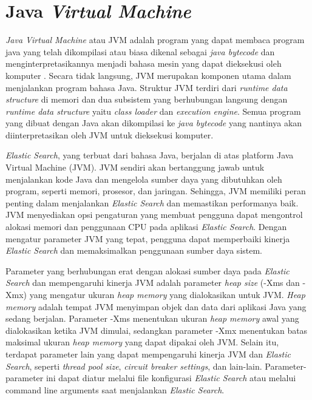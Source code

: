 \section{Java \textit{Virtual Machine}}
\textit{Java Virtual Machine} atau JVM adalah program yang dapat membaca program java yang telah dikompilasi atau biasa dikenal sebagai \textit{java bytecode} dan menginterpretasikannya menjadi bahasa mesin yang dapat dieksekusi oleh komputer \parencite{java12}. Secara tidak langsung, JVM merupakan komponen utama dalam menjalankan program bahasa Java. Struktur JVM terdiri dari \textit{runtime data structure} di memori dan dua subsistem yang berhubungan langsung dengan \textit{runtime data structure} yaitu \textit{class loader} dan \textit{execution engine}. Semua program yang dibuat dengan Java akan dikompilasi ke \textit{java bytecode} yang nantinya akan diinterpretasikan oleh JVM untuk dieksekusi komputer.

\textit{Elastic Search}, yang terbuat dari bahasa Java, berjalan di atas platform Java Virtual Machine (JVM). JVM sendiri akan bertanggung jawab untuk menjalankan kode Java dan mengelola sumber daya yang dibutuhkan oleh program, seperti memori, prosesor, dan jaringan. Sehingga, JVM memiliki peran penting dalam menjalankan \textit{Elastic Search} dan memastikan performanya baik. JVM menyediakan opsi pengaturan yang membuat pengguna dapat mengontrol alokasi memori dan penggunaan CPU pada aplikasi \textit{Elastic Search}. Dengan mengatur parameter JVM yang tepat, pengguna dapat memperbaiki kinerja \textit{Elastic Search} dan memaksimalkan penggunaan sumber daya sistem.

Parameter yang berhubungan erat dengan alokasi sumber daya pada \textit{Elastic Search} dan mempengaruhi kinerja JVM adalah parameter \textit{heap size} (-Xms dan -Xmx) yang mengatur ukuran \textit{heap memory} yang dialokasikan untuk JVM. \textit{Heap memory} adalah tempat JVM menyimpan objek dan data dari aplikasi Java yang sedang berjalan. Parameter -Xms menentukan ukuran \textit{heap memory} awal yang dialokasikan ketika JVM dimulai, sedangkan parameter -Xmx menentukan batas maksimal ukuran \textit{heap memory} yang dapat dipakai oleh JVM. Selain itu, terdapat parameter lain yang dapat mempengaruhi kinerja JVM dan \textit{Elastic Search}, seperti \textit{thread pool size}, \textit{circuit breaker settings}, dan lain-lain. Parameter-parameter ini dapat diatur melalui file konfigurasi \textit{Elastic Search} atau melalui command line arguments saat menjalankan \textit{Elastic Search}.
